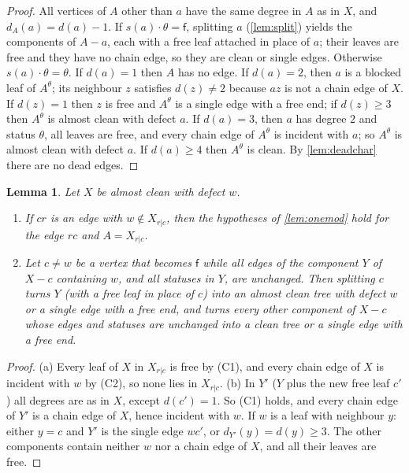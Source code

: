 \documentclass[11pt]{amsart}
\newtheorem{lemma}[theorem]{Lemma}
\theoremstyle{definition}
\theoremstyle{remark}
\newcommand{\sff}{\mathsf{f}}
\begin{document}
\begin{proof}
All vertices of $A$ other than $a$ have the same degree in $A$ as in $X$, and $d_A(a)=d(a)-1$.
If $s(a)\cdot\theta=\sff$, splitting $a$ (\cref{lem:split}) yields the components of $A-a$, each with
a free leaf attached in place of $a$; their leaves are free and they have no chain edge, so they are
clean or single edges. Otherwise $s(a)\cdot\theta=\theta$. If $d(a)=1$ then $A$ has no edge. If
$d(a)=2$, then $a$ is a blocked leaf of $A^\theta$; its neighbour $z$ satisfies $d(z)\ne2$ because
$az$ is not a chain edge of $X$. If $d(z)=1$ then $z$ is free and $A^\theta$ is a single edge with
a free end; if $d(z)\ge3$ then $A^\theta$ is almost clean with defect $a$. If $d(a)=3$, then $a$ has
degree $2$ and status $\theta$, all leaves are free, and every chain edge of $A^\theta$ is incident
with $a$; so $A^\theta$ is almost clean with defect $a$. If $d(a)\ge4$ then $A^\theta$ is clean.
By \cref{lem:deadchar} there are no dead edges.
\end{proof}

\begin{lemma}\label{lem:almostfacts}
Let $X$ be almost clean with defect $w$.
\begin{enumerate}[label=\textup{(\alph*)}]
\item If $cr$ is an edge with $w\notin X_{r|c}$, then the hypotheses of \cref{lem:onemod} hold
for the edge $rc$ and $A=X_{r|c}$.
\item Let $c\neq w$ be a vertex that becomes $\sff$ while all edges of the component $Y$ of $X-c$
containing $w$, and all statuses in $Y$, are unchanged. Then splitting $c$ turns $Y$ (with a free
leaf in place of $c$) into an almost clean tree with defect $w$ or a single edge with a free end,
and turns every other component of $X-c$ whose edges and statuses are unchanged into a clean tree
or a single edge with a free end.
\end{enumerate}
\end{lemma}

\begin{proof}
(a) Every leaf of $X$ in $X_{r|c}$ is free by (C1), and every chain edge of $X$ is incident with
$w$ by (C2), so none lies in $X_{r|c}$.
(b) In $Y'$ ($Y$ plus the new free leaf $c'$) all degrees are as in $X$, except $d(c')=1$. So
(C1) holds, and every chain edge of $Y'$ is a chain edge of $X$, hence incident with $w$. If $w$ is
a leaf with neighbour $y$: either $y=c$ and $Y'$ is the single edge $wc'$, or $d_{Y'}(y)=d(y)\ge3$.
The other components contain neither $w$ nor a chain edge of $X$, and all their leaves are free.
\end{proof}
\end{document}
